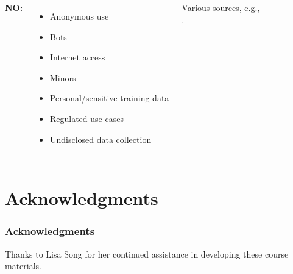 \documentclass[11pt,
               aspectratio=169,
               hyperref={colorlinks}
               ]{beamer}
\begin{document}
\begin{frame}
\begin{columns}
					\textbf{NO:}
					\begin{itemize}\small
						\item Anonymous use
						\item Bots
						\item Internet access
						\item Minors
						\item Personal/sensitive training data
						\item Regulated use cases
						\item Undisclosed data collection
					\end{itemize}
					\vspace{5pt}
					\tiny{Various sources, e.g.,\\ \cite{weidinger2022taxonomy}.}
				
			\end{columns}
					
		\end{frame}


\section{Acknowledgments} 

\begin{frame}
	
	\frametitle{Acknowledgments}
	
	Thanks to Lisa Song for her continued assistance in developing these course materials.
	
\end{frame}	





			
\end{document}
